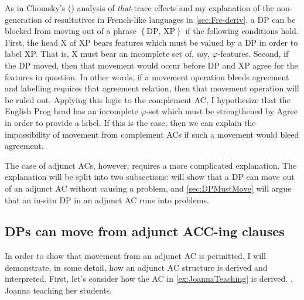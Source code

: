 \documentclass[MilwayThesis]{subfiles}
\begin{document}
As in Chomsky's (\citeyear{chomsky2015problems}) analysis of \textit{that}-trace effects and my explanation of the non-generation of resultatives in French-like languages in \cref{sec:Fre-deriv}, a DP can be blocked from moving out of a phrase $\left\{ \text{DP, XP} \right\}$ if the following conditions hold.
First, the head X of XP bears features which must be valued by a DP in order to label XP.
That is, X must bear an incomplete set of, say, $\varphi$-features.
Second, if the DP moved, then that movement would occur before DP and XP agree for the features in question.
In other words, if a movement operation bleeds agreement and labelling requires that agreement relation, then that movement operation will be ruled out.
Applying this logic to the complement AC, I hypothesize that the English Prog head has an incomplete $\varphi$-set which must be strengthened by Agree in order to provide a label.
If this is the case, then we can explain the impossibility of movement from complement ACs if such a movement would bleed agreement.

The case of adjunct ACs, however, requires a more complicated explanation.
The explanation will be split into two subsections:  will show that a DP can move out of an adjunct AC without causing a problem, and \cref{sec:DPMustMove} will argue that an in-situ DP in an adjunct AC runs into problems.

\subsection{DPs can move from adjunct ACC-ing clauses}\label{sec:DPCanMove}
In order to show that movement from an adjunct AC is permitted, I will demonstrate, in some detail, how an adjunct AC structure is derived and interpreted.
First, let's consider how the AC in \cref{ex:JoannaTeaching} is derived.
\ex.\label{ex:JoannaTeaching} Joanna teaching her students.
\end{document}
